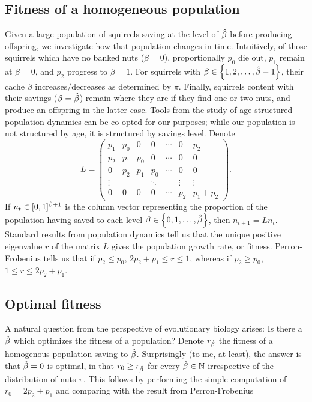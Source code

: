 \subsection{Fitness of a homogeneous population}
Given a large population of squirrels saving at the level of $\hat{\beta}$ before producing
offspring, we investigate how that population changes in time. Intuitively, of those squirrels
which have no banked nuts ($\beta = 0$), proportionally $p_0$ die out, $p_1$ remain at $\beta = 0$, and
$p_2$ progress to $\beta = 1$. For squirrels with $\beta\in\left\{ 1, 2, \ldots, \hat{\beta} - 1 \right\}$, their
cache $\beta$ increases/decreases as determined by $\pi$. Finally, squirrels content with their savings
($\beta = \hat{\beta}$) remain where they are if they find one or two nuts, and produce an offspring in the
latter case. Tools from the study of age-structured population dynamics can be co-opted for our purposes;
while our population is not structured by age, it is structured by savings level. Denote
$$ 
L = 
\begin{pmatrix}
    p_1 & p_0 & 0 & 0 & \cdots & 0 & p_2 \\
    p_2 & p_1 & p_0 & 0 &\cdots & 0 & 0 \\
    0 & p_2 & p_1 & p_0 & \cdots & 0 & 0 \\
    \vdots &  &   & \ddots  & & \vdots & \vdots \\
    0 & 0 & 0 & 0 & \cdots & p_2 & p_1 + p_2
\end{pmatrix}.
$$
If $n_t\in[0,1]^{\hat{\beta}+1}$ is the column vector representing the proportion of the population
having saved to each level $\beta\in\left\{ 0, 1, \ldots, \hat{\beta} \right\}$, then 
$n_{t+1} = L n_t$. Standard results from population dynamics tell us that the unique 
positive eigenvalue $r$ of the matrix $L$ gives the population growth rate, or fitness. Perron-Frobenius tells
us that if $p_2\le p_0$, $2p_2 + p_1 \le r \le 1$, whereas if $p_2 \ge  p_0$, $1\le r\le 2p_2 + p_1$. 
\subsection{Optimal fitness}
A natural question from the perspective of evolutionary biology arises: Is there a $\hat{\beta}$ which
optimizes the fitness of a population? Denote $r_{\hat{\beta}}$ the fitness of a homogenous population
saving to $\hat{\beta}$. Surprisingly (to me, at least), the answer is that 
$\hat{\beta} = 0$ is optimal, in that $r_0 \ge r_{\hat{\beta}}$ for every $\hat{\beta}\in\mathbb{N}$ irrespective of the 
distribution of nuts $\pi$. This follows by performing the simple computation of $r_0 = 2p_2 + p_1$ and
comparing with the result from Perron-Frobenius


